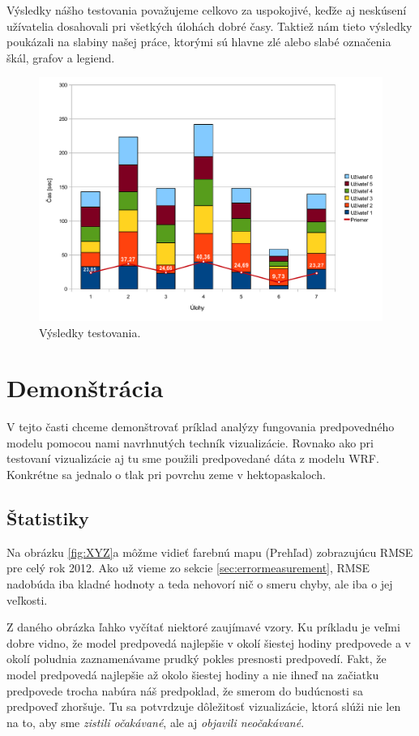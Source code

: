 Výsledky nášho testovania považujeme celkovo za uspokojivé, keďže aj neskúsení užívatelia dosahovali pri všetkých úlohách dobré časy. Taktiež nám tieto výsledky poukázali na slabiny našej práce, ktorými sú hlavne zlé alebo slabé označenia škál, grafov a legiend.

\begin{figure}
	\centering
	\includegraphics[width = 5in]{resultchart}
	\caption{Výsledky testovania.}
	\label{fig:results} 
\end{figure}

\section{Demonštrácia}
V tejto časti chceme demonštrovať príklad analýzy fungovania predpovedného modelu pomocou nami navrhnutých techník vizualizácie. Rovnako ako pri testovaní vizualizácie aj tu sme použili predpovedané dáta z modelu WRF. Konkrétne sa jednalo o tlak pri povrchu zeme v hektopaskaloch.

\subsection{Štatistiky}
Na obrázku \ref{fig:XYZ}a môžme vidieť farebnú mapu (Prehľad) zobrazujúcu RMSE pre celý rok 2012. Ako už vieme zo sekcie \ref{sec:errormeasurement}, RMSE nadobúda iba kladné hodnoty a teda nehovorí nič o smeru chyby, ale iba o jej veľkosti. 

Z daného obrázka ľahko vyčítať niektoré zaujímavé vzory. Ku príkladu je veľmi dobre vidno, že model predpovedá najlepšie v okolí šiestej hodiny predpovede a v okolí poludnia zaznamenávame prudký pokles presnosti predpovedí. Fakt, že model predpovedá najlepšie až okolo šiestej hodiny a nie ihneď na začiatku predpovede trocha nabúra náš predpoklad, že smerom do budúcnosti sa predpoveď zhoršuje. Tu sa potvrdzuje dôležitosť vizualizácie, ktorá slúži nie len na to, aby sme \textit{zistili očakávané}, ale aj \textit{objavili neočakávané}.

